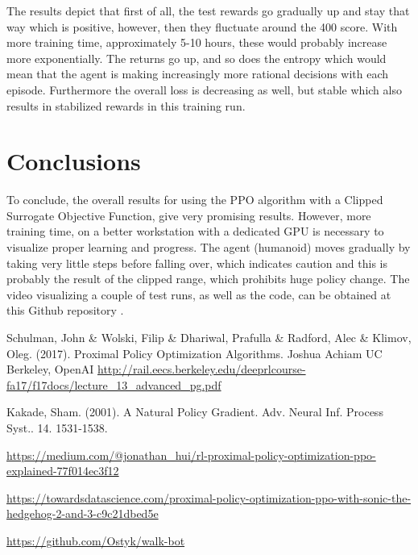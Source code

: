 \documentclass[12pt,a4paper]{article}
\begin{document}
The results depict that first of all, the test rewards go gradually up and stay that way which is positive, however, then they fluctuate around the 400 score. With more training time, approximately 5-10 hours, these would probably increase more exponentially. The returns go up, and so does the entropy which would mean that the agent is making increasingly more rational decisions with each episode.  Furthermore the overall loss is decreasing as well, but stable which also results in stabilized rewards in this training run.

\section{Conclusions}

To conclude, the overall results for using the PPO algorithm with a Clipped Surrogate Objective Function, give very promising results. However, more training time, on a better workstation with a dedicated GPU is necessary to visualize proper learning and progress. The agent (humanoid) moves gradually by taking very little steps before falling over, which indicates caution and this is probably the result of the clipped range, which prohibits huge policy change. The video visualizing a couple of test runs, as well as the code, can be obtained at this Github repository \cite{code}.


\begin{thebibliography}{1}

 Schulman, John \& Wolski, Filip \& Dhariwal, Prafulla \& Radford, Alec \& Klimov, Oleg. (2017). Proximal Policy Optimization Algorithms. 
 Joshua Achiam UC Berkeley, OpenAI \url{http://rail.eecs.berkeley.edu/deeprlcourse-fa17/f17docs/lecture_13_advanced_pg.pdf}

 Kakade, Sham. (2001). A Natural Policy Gradient. Adv. Neural Inf. Process Syst.. 14. 1531-1538. 

 \url{https://medium.com/@jonathan_hui/rl-proximal-policy-optimization-ppo-explained-77f014ec3f12}

 \url{https://towardsdatascience.com/proximal-policy-optimization-ppo-with-sonic-the-hedgehog-2-and-3-c9c21dbed5e}

 \url{https://github.com/Ostyk/walk-bot}




\end{thebibliography}
\end{document}
